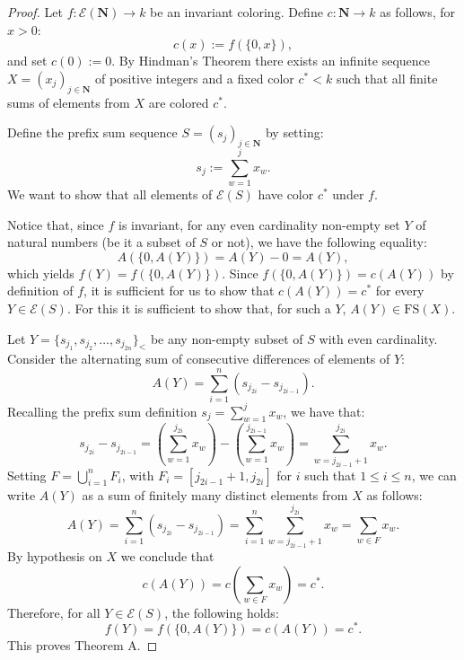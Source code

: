 \documentclass[11pt]{amsart}
\newcommand{\Nat}{\mathbf{N}}
\newcommand{\FS}{\mathrm{FS}}
\theoremstyle{definition}
\begin{document}
\begin{proof}

    Let $f: \mathcal{E}(\Nat) \to k$ be an invariant coloring. Define $c: \Nat \to k$ as follows, for $x >0$:
    $$c(x) := f(\{0, x\}),$$
 and set $c(0):=0$. By Hindman's Theorem there exists an infinite sequence $X = (x_j)_{j \in \Nat}$ of positive integers and a fixed color $c^* < k$ such that all finite sums of elements from $X$ are colored $c^*$. 


Define the prefix sum sequence $S = (s_j)_{j \in \Nat}$ by setting:
    $$s_j := \sum_{w=1}^j x_w.$$
We want to show that all elements of $\mathcal{E}(S)$ have color $c^*$ under $f$.
  
Notice that, since $f$ is invariant, for any even cardinality non-empty set $Y$ of natural numbers (be it a subset of $S$ or not), we have the following equality: 
$$A(\{0, A(Y)\})=A(Y)-0=A(Y),$$ 
which yields $f(Y)=f(\{0, A(Y)\})$. Since $f(\{0, A(Y)\})=c(A(Y))$ by definition of $f$, it is sufficient for us to show that 
$c(A(Y))=c^*$ for every $Y \in \mathcal{E}(S)$. For this it is sufficient to show that, for such a $Y$, $A(Y) \in \FS(X)$. 

Let $Y = \{s_{j_1}, s_{j_2}, \dots, s_{j_{2n}}\}_<$ be any non-empty subset of $S$ with even cardinality. Consider the alternating sum of consecutive differences of elements of $Y$:
$$A(Y) = \sum_{i=1}^n (s_{j_{2i}} - s_{j_{2i-1}}).$$
    Recalling the prefix sum definition $s_j = \sum_{w=1}^j x_w$, we have that:
    $$s_{j_{2i}} - s_{j_{2i-1}} = \left(\sum_{w=1}^{j_{2i}} x_w\right) - \left(\sum_{w=1}^{j_{2i-1}} x_w\right) = \sum_{w=j_{2i-1}+1}^{j_{2i}} x_w.$$
Setting $F = \bigcup_{i=1}^n F_i$, with $F_i=[j_{2i-1}+1, j_{2i}]$ for $i$ such that $1\leq i \leq n$, we can write $A(Y)$ as a sum of finitely many distinct elements from $X$ as follows:
    $$A(Y)=\sum_{i=1}^{n}(s_{j_{2i}}-s_{j_{2i-1}})=\sum_{i=1}^{n}\sum_{w=j_{2i-1}+1}^{j_{2i}}x_w=\sum_{w \in F} x_w.$$
By hypothesis on $X$ we conclude that
    $$c(A(Y))=c\left(\sum_{w \in F} x_w\right) = c^*.$$
Therefore, for all $Y \in \mathcal{E}(S)$, the following holds:
    $$f(Y)=f(\{0, A(Y)\})=c(A(Y)) = c^*.$$
This proves Theorem A.
\end{proof}
\end{document}
